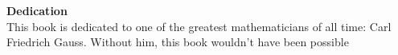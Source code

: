 \textbf{Dedication}
\\
This book is dedicated to one of the greatest mathematicians of
all time: Carl Friedrich Gauss. Without him, this book wouldn't
have been possible